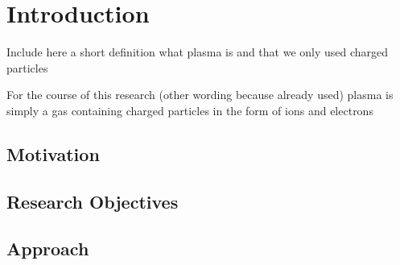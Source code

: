 \setcounter{page}{1}
\chapter{Introduction}

Include here a short definition what plasma is and that we only used charged particles 

For the course of this research (other wording because already used) plasma is simply a gas containing charged particles in the form of ions and electrons




\section{Motivation}

\section{Research Objectives}


\section{Approach}